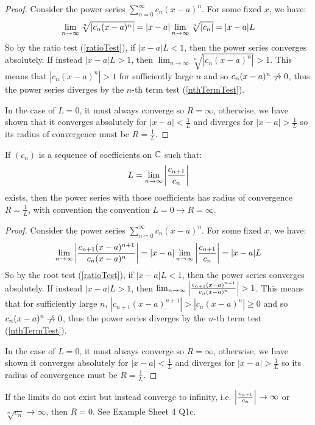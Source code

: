 \documentclass[../main.tex]{subfiles}
\begin{document}
\begin{proof}
  Consider the power series $\sum_{n = 0}^{\infty} c_n(x - a)^{n}$.
  For some fixed $x$, we have:
  \[
    \lim_{n \to \infty} \sqrt[n]{\left\lvert c_n(x - a)^{n} \right\rvert} = |x - a|\lim_{n \to \infty} \sqrt[n]{\left\lvert c_n \right\rvert} = |x - a|L
  \]
  So by the ratio test (\cref{ratioTest}), if $|x - a|L < 1$, then the power series converges absolutely.
  If instead $|x - a|L > 1$, then $\lim_{n \to \infty} \sqrt[n]{|c_n(x - a)^{n}|} > 1$.
  This means that $|c_n(x - a)^{n}| > 1$ for sufficiently large $n$ and so $c_n(x - a)^{n} \centernot\to 0$, thus the power series diverges by the $n$-th term test (\cref{nthTermTest}).

  In the case of $L = 0$, it must always converge so $R = \infty$, otherwise, we have shown that it converges absolutely for $|x - a| < \frac{1}{L}$ and diverges for $|x - a| > \frac{1}{L}$ so its radius of convergence must be $R = \frac{1}{L}$.
\end{proof}
\begin{proposition}
  If $(c_n)$ is a sequence of coefficients on $\mathbb{C}$ such that: \label{ratioPowerSeries}
  \[
    L = \lim_{n \to \infty} \left\lvert \frac{c_{n + 1}}{c_n} \right\rvert
  \]
  exists, then the power series with those coefficients has radius of convergence $R = \frac{1}{L}$, with convention the convention $L = 0 \to R = \infty$.
\end{proposition}
\begin{proof}
  Consider the power series $\sum_{n = 0}^{\infty} c_n(x - a)^{n}$.
  For some fixed $x$, we have:
  \[
    \lim_{n \to \infty} \left\lvert \frac{c_{n + 1}(x - a)^{n + 1}}{c_n(x - a)^{n}} \right\rvert = |x - a|\lim_{n \to \infty} \left\lvert \frac{c_{n + 1}}{c_n} \right\rvert = |x - a|L
  \]
  So by the root test (\cref{ratioTest}), if $|x - a|L < 1$, then the power series converges absolutely.
  If instead $|x - a|L > 1$, then $\lim_{n \to \infty} \left\lvert \frac{c_{n + 1}(x - a)^{n + 1}}{c_n(x - a)^{n}} \right\rvert > 1$.
  This means that for sufficiently large $n$, $|c_{n + 1}(x - a)^{n + 1}| > |c_n(x - a)^{n}| \geq 0$ and so $c_n(x - a)^{n} \centernot\to 0$, thus the power series diverges by the $n$-th term test (\cref{nthTermTest}).

  In the case of $L = 0$, it must always converge so $R = \infty$, otherwise, we have shown it converges absolutely for $|x - a| < \frac{1}{L}$ and diverges for $|x - a| > \frac{1}{L}$ so its radius of convergence must be $R = \frac{1}{L}$.
\end{proof}
\begin{remark}[Note]
  If the limits do not exist but instead converge to infinity, i.e. $\left\lvert \frac{c_{n + 1}}{c_n} \right\rvert \to \infty$ or $\sqrt[n]{c_n} \to \infty$, then $R = 0$.
  See Example Sheet 4 Q1c.
\end{remark}
\end{document}
